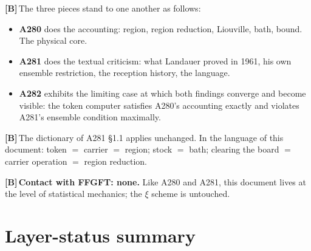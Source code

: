 \documentclass[11pt,a4paper]{article}
\newcommand{\LB}{\textcolor{layB}{\textbf{\footnotesize\textsf{[B]}}}\,}
\begin{document}
\LB The three pieces stand to one another as follows:

\begin{itemize}[leftmargin=1.4em,itemsep=0.3em]
  \item \textbf{A280} does the accounting: region, region reduction, Liouville,
        bath, bound. The physical core.
  \item \textbf{A281} does the textual criticism: what Landauer proved in 1961,
        his own ensemble restriction, the reception history, the language.
  \item \textbf{A282} exhibits the limiting case at which both findings converge
        and become visible: the token computer satisfies A280's accounting exactly
        and violates A281's ensemble condition maximally.
\end{itemize}

\LB The dictionary of A281 §1.1 applies unchanged. In the language of this
document: token $=$ carrier $=$ region; stock $=$ bath; clearing the board $=$
carrier operation $=$ region reduction.

\LB \textbf{Contact with FFGFT: none.} Like A280 and A281, this document lives at
the level of statistical mechanics; the $\xi$ scheme is untouched.

\section{Layer-status summary}
\end{document}
